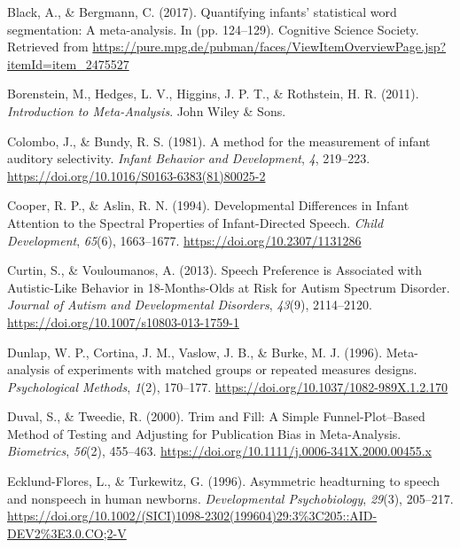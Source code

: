 \documentclass[
  english,
  man]{apa6}
\begin{document}
\leavevmode\hypertarget{ref-black_quantifying_2017}{}%
Black, A., \& Bergmann, C. (2017). Quantifying infants' statistical word segmentation: A meta-analysis. In (pp. 124--129). Cognitive Science Society. Retrieved from \url{https://pure.mpg.de/pubman/faces/ViewItemOverviewPage.jsp?itemId=item_2475527}

\leavevmode\hypertarget{ref-borenstein_introduction_2011}{}%
Borenstein, M., Hedges, L. V., Higgins, J. P. T., \& Rothstein, H. R. (2011). \emph{Introduction to Meta-Analysis}. John Wiley \& Sons.

\leavevmode\hypertarget{ref-colombo_method_1981}{}%
Colombo, J., \& Bundy, R. S. (1981). A method for the measurement of infant auditory selectivity. \emph{Infant Behavior and Development}, \emph{4}, 219--223. \url{https://doi.org/10.1016/S0163-6383(81)80025-2}

\leavevmode\hypertarget{ref-cooper_developmental_1994}{}%
Cooper, R. P., \& Aslin, R. N. (1994). Developmental Differences in Infant Attention to the Spectral Properties of Infant-Directed Speech. \emph{Child Development}, \emph{65}(6), 1663--1677. \url{https://doi.org/10.2307/1131286}

\leavevmode\hypertarget{ref-curtin_speech_2013}{}%
Curtin, S., \& Vouloumanos, A. (2013). Speech Preference is Associated with Autistic-Like Behavior in 18-Months-Olds at Risk for Autism Spectrum Disorder. \emph{Journal of Autism and Developmental Disorders}, \emph{43}(9), 2114--2120. \url{https://doi.org/10.1007/s10803-013-1759-1}

\leavevmode\hypertarget{ref-dunlap_meta-analysis_1996}{}%
Dunlap, W. P., Cortina, J. M., Vaslow, J. B., \& Burke, M. J. (1996). Meta-analysis of experiments with matched groups or repeated measures designs. \emph{Psychological Methods}, \emph{1}(2), 170--177. \url{https://doi.org/10.1037/1082-989X.1.2.170}

\leavevmode\hypertarget{ref-duval_trim_2000}{}%
Duval, S., \& Tweedie, R. (2000). Trim and Fill: A Simple Funnel-Plot--Based Method of Testing and Adjusting for Publication Bias in Meta-Analysis. \emph{Biometrics}, \emph{56}(2), 455--463. \url{https://doi.org/10.1111/j.0006-341X.2000.00455.x}

\leavevmode\hypertarget{ref-ecklund-flores_asymmetric_1996}{}%
Ecklund-Flores, L., \& Turkewitz, G. (1996). Asymmetric headturning to speech and nonspeech in human newborns. \emph{Developmental Psychobiology}, \emph{29}(3), 205--217. \url{https://doi.org/10.1002/(SICI)1098-2302(199604)29:3\%3C205::AID-DEV2\%3E3.0.CO;2-V}
\end{document}
